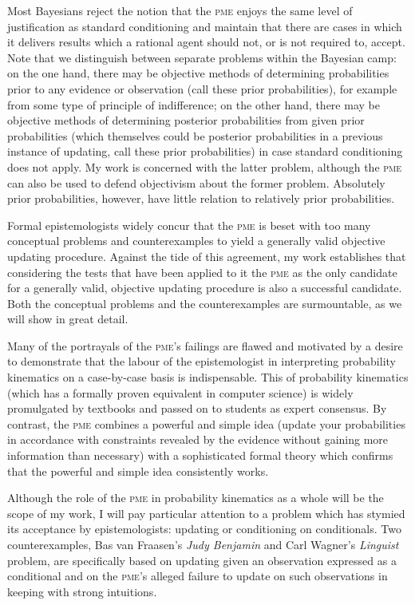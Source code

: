 \documentclass[11pt]{article}
\begin{document}
Most Bayesians reject the notion that the \textsc{pme} enjoys the same
level of justification as standard conditioning and maintain that
there are cases in which it delivers results which a rational agent
should not, or is not required to, accept. Note that we distinguish
between separate problems within the Bayesian camp: on the one hand,
there may be objective methods of determining probabilities prior to
any evidence or observation (call these  prior
probabilities), for example from some type of principle of
indifference; on the other hand, there may be objective methods of
determining posterior probabilities from given prior probabilities
(which themselves could be posterior probabilities in a previous
instance of updating, call these  prior
probabilities) in case standard conditioning does not apply. My work
is concerned with the latter problem, although the \textsc{pme} can
also be used to defend objectivism about the former problem.
Absolutely prior probabilities, however, have little relation to
relatively prior probabilities.


Formal epistemologists widely concur that the \textsc{pme} is beset
with too many conceptual problems and counterexamples to yield a
generally valid objective updating procedure. Against the tide of this
agreement, my work establishes that considering the tests that have
been applied to it the \textsc{pme} as the only candidate for a
generally valid, objective updating procedure is also a successful
candidate. Both the conceptual problems and the counterexamples are
surmountable, as we will show in great detail.

Many of the portrayals of the \textsc{pme}'s failings are flawed and
motivated by a desire to demonstrate that the labour of the
epistemologist in interpreting probability kinematics on a
case-by-case basis is indispensable. This  of probability kinematics (which has a formally proven
equivalent in computer science) is widely promulgated by textbooks and
passed on to students as expert consensus. By contrast, the
\textsc{pme} combines a powerful and simple idea (update your
probabilities in accordance with constraints revealed by the evidence
without gaining more information than necessary) with a sophisticated
formal theory which confirms that the powerful and simple idea
consistently works.

Although the role of the \textsc{pme} in probability kinematics as a
whole will be the scope of my work, I will pay particular attention to
a problem which has stymied its acceptance by epistemologists:
updating or conditioning on conditionals. Two counterexamples, Bas van
Fraasen's \emph{Judy Benjamin} and Carl Wagner's \emph{Linguist}
problem, are specifically based on updating given an observation
expressed as a conditional and on the \textsc{pme}'s alleged failure
to update on such observations in keeping with strong intuitions.
\end{document}
